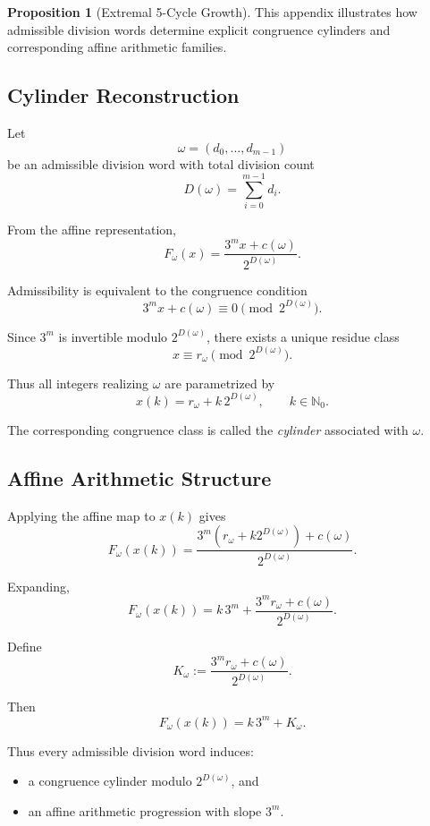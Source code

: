 \documentclass[12pt, oneside]{article}
\numberwithin{equation}{section}
\theoremstyle{definition}
\newtheorem{proposition}{Proposition}[section]
\theoremstyle{plain}
\theoremstyle{remark}
\begin{document}
\begin{proposition}[Extremal 5-Cycle Growth]
This appendix illustrates how admissible division words determine
explicit congruence cylinders and corresponding affine arithmetic
families.


\subsection{Cylinder Reconstruction}

Let
\[
\omega=(d_0,\dots,d_{m-1})
\]
be an admissible division word with total division count
\[
D(\omega)=\sum_{i=0}^{m-1} d_i.
\]

From the affine representation,
\[
F_\omega(x)
=
\frac{3^m x+c(\omega)}{2^{D(\omega)}}.
\]

Admissibility is equivalent to the congruence condition
\[
3^m x+c(\omega)\equiv0\pmod{2^{D(\omega)}}.
\]

Since \(3^m\) is invertible modulo \(2^{D(\omega)}\), there exists a
unique residue class
\[
x\equiv r_\omega \pmod{2^{D(\omega)}}.
\]

Thus all integers realizing \(\omega\) are parametrized by
\[
x(k)=r_\omega+k\,2^{D(\omega)},
\qquad
k\in\mathbb N_0.
\]

The corresponding congruence class is called the
\emph{cylinder} associated with \(\omega\).


\subsection{Affine Arithmetic Structure}

Applying the affine map to \(x(k)\) gives
\[
F_\omega(x(k))
=
\frac{3^m(r_\omega+k2^{D(\omega)})+c(\omega)}
     {2^{D(\omega)}}.
\]

Expanding,
\[
F_\omega(x(k))
=
k\,3^m
+
\frac{3^m r_\omega+c(\omega)}
     {2^{D(\omega)}}.
\]

Define
\[
K_\omega
:=
\frac{3^m r_\omega+c(\omega)}
     {2^{D(\omega)}}.
\]

Then
\[
F_\omega(x(k))
=
k\,3^m+K_\omega.
\]

Thus every admissible division word induces:

\begin{itemize}
\item a congruence cylinder modulo \(2^{D(\omega)}\), and
\item an affine arithmetic progression with slope \(3^m\).
\end{itemize}


\end{proposition}
\end{document}
